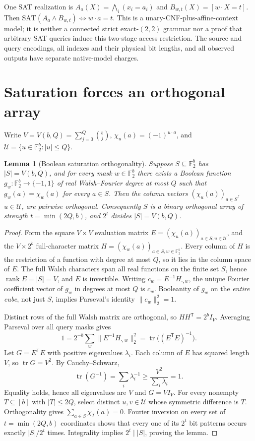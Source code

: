 \documentclass[10pt]{article}
\newtheorem{lemma}[theorem]{Lemma}
\newcommand{\F}{\mathbb F_2}
\begin{document}
One SAT realization is \(A_a(X)=\bigwedge_i (x_i=a_i)\) and \(B_{w,t}(X)=[w\cdot X=t]\). Then \(\mathrm{SAT}(A_a\wedge B_{w,t})\iff w\cdot a=t\). This is a unary-CNF-plus-affine-context model; it is neither a connected strict exact-$(2,2)$ grammar nor a proof that arbitrary SAT queries induce this two-stage access restriction. The source and query encodings, all indexes and their physical bit lengths, and all observed outputs have separate native-model charges.

\section{Saturation forces an orthogonal array}
Write \(V=V(b,Q)=\sum_{j=0}^{Q}\binom bj\), \(\chi_u(a)=(-1)^{u\cdot a}\), and \(\mathcal U=\{u\in\F^b:|u|\le Q\}\).
\begin{lemma}[Boolean saturation orthogonality]\label{lem:saturation}
Suppose \(S\subseteq\F^b\) has \(|S|=V(b,Q)\), and for every mask \(w\in\F^b\) there exists a Boolean function \(g_w:\F^b\to\{-1,1\}\) of real Walsh--Fourier degree at most \(Q\) such that \(g_w(a)=\chi_w(a)\) for every \(a\in S\). Then the column vectors \((\chi_u(a))_{a\in S}\), \(u\in\mathcal U\), are pairwise orthogonal. Consequently \(S\) is a binary orthogonal array of strength \(t=\min(2Q,b)\), and \(2^t\) divides \(|S|=V(b,Q)\).
\end{lemma}
\begin{proof}
Form the square \(V\times V\) evaluation matrix \(E=(\chi_u(a))_{a\in S,u\in\mathcal U}\), and the \(V\times2^b\) full-character matrix \(H=(\chi_w(a))_{a\in S,w\in\F^b}\). Every column of \(H\) is the restriction of a function with degree at most \(Q\), so it lies in the column space of \(E\). The full Walsh characters span all real functions on the finite set \(S\), hence \(\operatorname{rank} E=|S|=V\), and \(E\) is invertible. Writing \(c_w=E^{-1}H_{\cdot,w}\), the unique Fourier coefficient vector of \(g_w\) in degrees at most \(Q\) is \(c_w\). Booleanity of \(g_w\) on the \emph{entire cube}, not just \(S\), implies Parseval's identity \(\|c_w\|_2^2=1\).

Distinct rows of the full Walsh matrix are orthogonal, so \(HH^{\mathsf T}=2^b I_V\). Averaging Parseval over all query masks gives
\[
1=2^{-b}\sum_w\|E^{-1}H_{\cdot,w}\|_2^2
  =\operatorname{tr}\bigl((E^{\mathsf T}E)^{-1}\bigr).
\]
Let \(G=E^{\mathsf T}E\) with positive eigenvalues \(\lambda_i\). Each column of \(E\) has squared length \(V\), so \(\operatorname{tr}G=V^2\). By Cauchy--Schwarz,
\[
\operatorname{tr}(G^{-1})=\sum_i\lambda_i^{-1}
\ge\frac{V^2}{\sum_i\lambda_i}=1.
\]
Equality holds, hence all eigenvalues are \(V\) and \(G=VI_V\). For every nonempty \(T\subseteq[b]\) with \(|T|\le2Q\), select distinct \(u,v\in\mathcal U\) whose symmetric difference is \(T\). Orthogonality gives \(\sum_{a\in S}\chi_T(a)=0\). Fourier inversion on every set of \(t=\min(2Q,b)\) coordinates shows that every one of its \(2^t\) bit patterns occurs exactly \(|S|/2^t\) times. Integrality implies \(2^t\mid|S|\), proving the lemma.
\end{proof}
\end{document}
